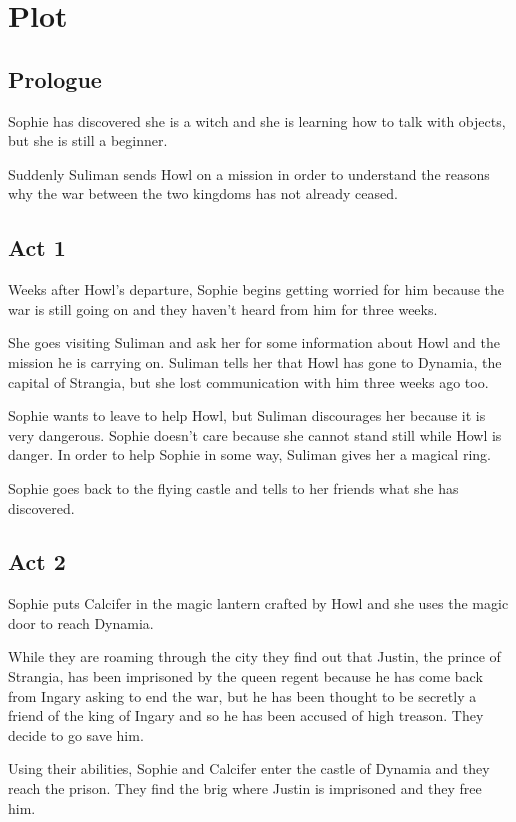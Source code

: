 \section{Plot}

\subsection*{Prologue}
Sophie has discovered she is a witch and she is learning how to talk with objects, but she is still a beginner.

Suddenly Suliman sends Howl on a mission in order to understand the reasons why the war between the two kingdoms has not already ceased.

\subsection*{Act 1}
Weeks after Howl's departure, Sophie begins getting worried for him because the war is still going on and they haven't heard from him for three weeks.

She goes visiting Suliman and ask her for some information about Howl and the mission he is carrying on. Suliman tells her that Howl has gone to Dynamia, the capital of Strangia, but she lost communication with him three weeks ago too.

Sophie wants to leave to help Howl, but Suliman discourages her because it is very dangerous. Sophie doesn't care because she cannot stand still while Howl is danger. In order to help Sophie in some way, Suliman gives her a magical ring.

Sophie goes back to the flying castle and tells to her friends what she has discovered.

\subsection*{Act 2}
Sophie puts Calcifer in the magic lantern crafted by Howl and she uses the magic door to reach Dynamia.

While they are roaming through the city they find out that Justin, the prince of Strangia, has been imprisoned by the queen regent because he has come back from Ingary asking to end the war, but he has been thought to be secretly a friend of the king of Ingary and so he has been accused of high treason. They decide to go save him.

Using their abilities, Sophie and Calcifer enter the castle of Dynamia and they reach the prison. They find the brig where Justin is imprisoned and they free him.

